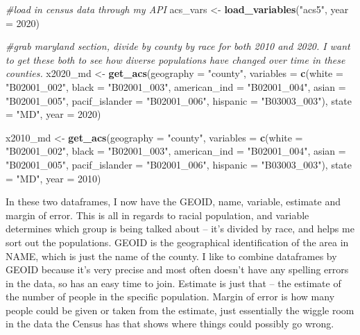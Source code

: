\documentclass[
]{article}
\newenvironment{Shaded}{\begin{snugshade}}{\end{snugshade}}
\newcommand{\AttributeTok}[1]{\textcolor[rgb]{0.13,0.29,0.53}{#1}}
\newcommand{\CommentTok}[1]{\textcolor[rgb]{0.56,0.35,0.01}{\textit{#1}}}
\newcommand{\DecValTok}[1]{\textcolor[rgb]{0.00,0.00,0.81}{#1}}
\newcommand{\FunctionTok}[1]{\textcolor[rgb]{0.13,0.29,0.53}{\textbf{#1}}}
\newcommand{\NormalTok}[1]{#1}
\newcommand{\OtherTok}[1]{\textcolor[rgb]{0.56,0.35,0.01}{#1}}
\newcommand{\StringTok}[1]{\textcolor[rgb]{0.31,0.60,0.02}{#1}}
\begin{document}
\begin{Shaded}
\begin{Highlighting}[]
\CommentTok{\#load in census data through my API}
\NormalTok{acs\_vars }\OtherTok{\textless{}{-}} \FunctionTok{load\_variables}\NormalTok{(}\StringTok{"acs5"}\NormalTok{, }\AttributeTok{year =} \DecValTok{2020}\NormalTok{)}

\CommentTok{\#grab maryland section, divide by county by race for both 2010 and 2020. I want to get these both to see how diverse populations have changed over time in these counties.}
\NormalTok{x2020\_md }\OtherTok{\textless{}{-}} \FunctionTok{get\_acs}\NormalTok{(}\AttributeTok{geography =} \StringTok{"county"}\NormalTok{,}
              \AttributeTok{variables =} \FunctionTok{c}\NormalTok{(}\AttributeTok{white =} \StringTok{"B02001\_002"}\NormalTok{, }
                            \AttributeTok{black =} \StringTok{"B02001\_003"}\NormalTok{,}
                            \AttributeTok{american\_ind =} \StringTok{"B02001\_004"}\NormalTok{,}
                            \AttributeTok{asian =} \StringTok{"B02001\_005"}\NormalTok{,}
                            \AttributeTok{pacif\_islander =} \StringTok{"B02001\_006"}\NormalTok{,}
                            \AttributeTok{hispanic =} \StringTok{"B03003\_003"}\NormalTok{),}
              \AttributeTok{state =} \StringTok{"MD"}\NormalTok{,}
              \AttributeTok{year =} \DecValTok{2020}\NormalTok{) }

\NormalTok{x2010\_md }\OtherTok{\textless{}{-}} \FunctionTok{get\_acs}\NormalTok{(}\AttributeTok{geography =} \StringTok{"county"}\NormalTok{,}
              \AttributeTok{variables =} \FunctionTok{c}\NormalTok{(}\AttributeTok{white =} \StringTok{"B02001\_002"}\NormalTok{, }
                            \AttributeTok{black =} \StringTok{"B02001\_003"}\NormalTok{,}
                            \AttributeTok{american\_ind =} \StringTok{"B02001\_004"}\NormalTok{,}
                            \AttributeTok{asian =} \StringTok{"B02001\_005"}\NormalTok{,}
                            \AttributeTok{pacif\_islander =} \StringTok{"B02001\_006"}\NormalTok{,}
                            \AttributeTok{hispanic =} \StringTok{"B03003\_003"}\NormalTok{),}
              \AttributeTok{state =} \StringTok{"MD"}\NormalTok{,}
              \AttributeTok{year =} \DecValTok{2010}\NormalTok{) }
\end{Highlighting}
\end{Shaded}

In these two dataframes, I now have the GEOID, name, variable, estimate
and margin of error. This is all in regards to racial population, and
variable determines which group is being talked about -- it's divided by
race, and helps me sort out the populations. GEOID is the geographical
identification of the area in NAME, which is just the name of the
county. I like to combine dataframes by GEOID because it's very precise
and most often doesn't have any spelling errors in the data, so has an
easy time to join. Estimate is just that -- the estimate of the number
of people in the specific population. Margin of error is how many people
could be given or taken from the estimate, just essentially the wiggle
room in the data the Census has that shows where things could possibly
go wrong.
\end{document}

